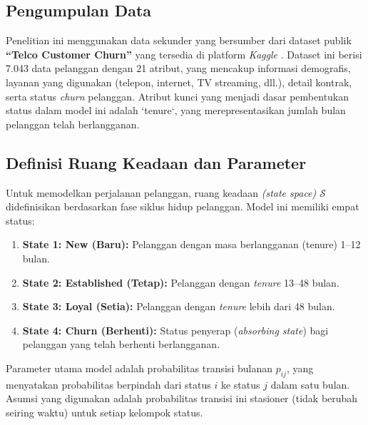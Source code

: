 \documentclass[a4paper,12pt]{article}
\begin{document}
\subsection{Pengumpulan Data}
Penelitian ini menggunakan data sekunder yang bersumber dari dataset publik \textbf{“Telco Customer Churn”} yang tersedia di platform \textit{Kaggle} \citep{kaggle_telco_churn}. Dataset ini berisi 7.043 data pelanggan dengan 21 atribut, yang mencakup informasi demografis, layanan yang digunakan (telepon, internet, TV streaming, dll.), detail kontrak, serta status \textit{churn} pelanggan. Atribut kunci yang menjadi dasar pembentukan status dalam model ini adalah `tenure`, yang merepresentasikan jumlah bulan pelanggan telah berlangganan.

\subsection{Definisi Ruang Keadaan dan Parameter}
Untuk memodelkan perjalanan pelanggan, ruang keadaan \textit{(state space)} $\mathcal{S}$ didefinisikan berdasarkan fase siklus hidup pelanggan. Model ini memiliki empat status:
\begin{enumerate}
    \item \textbf{State 1: New (Baru):} Pelanggan dengan masa berlangganan (tenure) 1–12 bulan.
    \item \textbf{State 2: Established (Tetap):} Pelanggan dengan \textit{tenure} 13–48 bulan.
    \item \textbf{State 3: Loyal (Setia):} Pelanggan dengan \textit{tenure} lebih dari 48 bulan.
    \item \textbf{State 4: Churn (Berhenti):} Status penyerap (\textit{absorbing state}) bagi pelanggan yang telah berhenti berlangganan.
\end{enumerate}
Parameter utama model adalah probabilitas transisi bulanan $p_{ij}$, yang menyatakan probabilitas berpindah dari status $i$ ke status $j$ dalam satu bulan. Asumsi yang digunakan adalah probabilitas transisi ini stasioner (tidak berubah seiring waktu) untuk setiap kelompok status.
\end{document}
